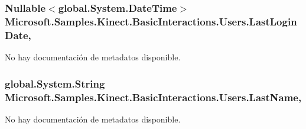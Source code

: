 \hypertarget{class_microsoft_1_1_samples_1_1_kinect_1_1_basic_interactions_1_1_users_a6c6f7606351fd3e59831dfafba8cc667}{
\subsubsection[{Last\-Login\-Date}]{\setlength{\rightskip}{0pt plus 5cm}Nullable$<$global.\-System.\-Date\-Time$>$ Microsoft.\-Samples.\-Kinect.\-Basic\-Interactions.\-Users.\-Last\-Login\-Date\hspace{0.3cm}{\ttfamily [get]}, {\ttfamily [set]}}}\label{class_microsoft_1_1_samples_1_1_kinect_1_1_basic_interactions_1_1_users_a6c6f7606351fd3e59831dfafba8cc667}


No hay documentación de metadatos disponible. 

\hypertarget{class_microsoft_1_1_samples_1_1_kinect_1_1_basic_interactions_1_1_users_a6e000a40f5a0ad78dc5014c4bbe557bb}{
\subsubsection[{Last\-Name}]{\setlength{\rightskip}{0pt plus 5cm}global.\-System.\-String Microsoft.\-Samples.\-Kinect.\-Basic\-Interactions.\-Users.\-Last\-Name\hspace{0.3cm}{\ttfamily [get]}, {\ttfamily [set]}}}\label{class_microsoft_1_1_samples_1_1_kinect_1_1_basic_interactions_1_1_users_a6e000a40f5a0ad78dc5014c4bbe557bb}


No hay documentación de metadatos disponible. 


